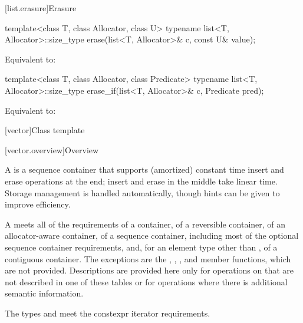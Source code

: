 [list.erasure]{Erasure}

%
\begin{itemdecl}
template<class T, class Allocator, class U>
  typename list<T, Allocator>::size_type
    erase(list<T, Allocator>& c, const U& value);
\end{itemdecl}

\begin{itemdescr}
\pnum
\effects
Equivalent to: 
\end{itemdescr}

%
\begin{itemdecl}
template<class T, class Allocator, class Predicate>
  typename list<T, Allocator>::size_type
    erase_if(list<T, Allocator>& c, Predicate pred);
\end{itemdecl}

\begin{itemdescr}
\pnum
\effects
Equivalent to: 
\end{itemdescr}

[vector]{Class template }

[vector.overview]{Overview}

\pnum
{}%
A
is a sequence container that supports
(amortized) constant time insert and erase operations at the end;
insert and erase in the middle take linear time.
Storage management is handled automatically, though hints can be given
to improve efficiency.

\pnum
A  meets all of the requirements
of a container,
of a reversible container,
of an allocator-aware container,
of a sequence container, including most of the optional sequence container
requirements,
and, for an element type other than ,
of a contiguous container.
The exceptions are the
, , , and  member functions, which are not
provided. Descriptions are provided here only for operations on 
that are not described in one of these tables or for operations where there is
additional semantic information.

\pnum
The types  and  meet
the constexpr iterator requirements.

